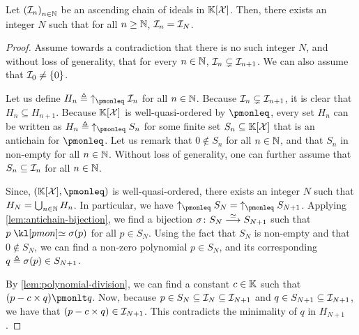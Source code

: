 \begin{theorem}
    Let $\seqof{\idl_n}$ be an
    ascending chain of ideals in $\Poly{\Indets}$.
    Then, there exists an integer $N$ such that for all $n \geq \mathbb{N}$,
    $\mathcal{I}_n = \mathcal{I}_N$.
\end{theorem}
\begin{proof}
    Assume towards a contradiction that there is no such
    integer $N$, and without loss of generality, that
    for every $n \in \mathbb{N}$, $\mathcal{I}_n \subsetneq \mathcal{I}_{n+1}$.
    We can also assume that $\mathcal{I}_0 \neq \{0\}$.

    Let us define $H_n \defined \upset[\pmonleq]{\idl_n}$ for all $n \in \mathbb{N}$.
    Because $\mathcal{I}_n \subsetneq \mathcal{I}_{n+1}$, it is clear that $H_n \subseteq
    H_{n+1}$. Because $\Poly{\Indets}$ is well-quasi-ordered by $\pmonleq$,
    every set $H_n$ can be written as $H_n \defined \upset[\pmonleq]{S_n}$ for
    some finite set $S_n \subseteq \Poly{\Indets}$ that is an antichain for
    $\pmonleq$. Let us remark that $0 \notin S_n$ for all $n \in \mathbb{N}$, and
    that $S_n$ in non-empty for all $n \in \mathbb{N}$.
    Without loss of generality, one can further assume that
    $S_n \subseteq \mathcal{I}_n$ for all $n \in \mathbb{N}$.

    Since, $(\Poly{\Indets}, \pmonleq)$ is well-quasi-ordered,
    there exists an integer $N$ such that 
    $H_N = \bigcup_{n \in \mathbb{N}} H_n$.
    In particular, we have $\upset[\pmonleq]{S_N} = \upset[\pmonleq]{S_{N+1}}$.
    Applying \cref{lem:antichain-bijection}, we find a bijection
    $\sigma \colon S_N \stackrel{\simeq}{\longrightarrow} S_{N+1}$ such that $p \pmoneq \sigma(p)$
    for all $p \in S_N$.
    Using the fact that $S_N$ is non-empty and that $0 \notin S_N$,
    we can find a non-zero polynomial $p \in S_N$,
    and its corresponding $q \triangleq \sigma(p) \in S_{N+1}$.

    By \cref{lem:polynomial-division}, we can find a constant $c \in \mathbb{K}$
    such that $(p - c \times q) \pmonlt q$. Now, because 
    $p \in S_N \subseteq \mathcal{I}_N \subseteq \mathcal{I}_{N+1}$ 
    and $q \in S_{N+1} \subseteq \mathcal{I}_{N+1}$,
    we have that $(p - c \times q) \in \mathcal{I}_{N+1}$.
    This contradicts the minimality of $q$ in $H_{N+1}$.
\end{proof}
